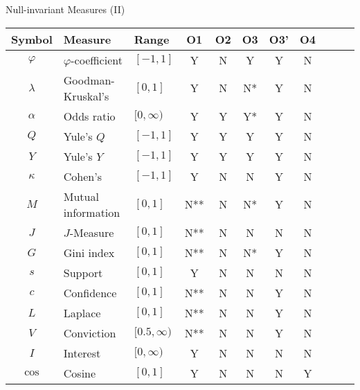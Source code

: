 \begin{frame}{Null-invariant Measures (II)}
	\centering
	\begin{tabular}{|c|l|l|c|c|c|c|c|c|c|c|}
		\hline
		\textbf{Symbol} & \textbf{Measure} & \textbf{Range} & 
		\textbf{O1} & \textbf{O2} & \textbf{O3} & \textbf{O3'} & 
		\textbf{O4} \\\hline
		$\varphi$ & $\varphi$-coefficient & $[-1,1]$       & Y   & N & Y  & Y 
		&   
		N \\
		$\lambda$ & Goodman-Kruskal's     & $[0,1]$        & Y   & N & N* & Y & 
		N \\
		$\alpha$  & Odds ratio            & $[0,\infty)$   & Y   & Y & Y* & Y & 
		N \\
		$Q$       & Yule's $Q$            & $[-1,1]$       & Y   & Y & Y  & Y & 
		N \\
		$Y$       & Yule's $Y$            & $[-1,1]$       & Y   & Y & Y  & Y & 
		N \\
		$\kappa$  & Cohen's               & $[-1,1]$       & Y   & N & N  & Y & 
		N \\
		$M$       & Mutual information    & $[0,1]$        & N** & N & N* & Y & 
		N \\
		$J$       & $J$-Measure           & $[0,1]$        & N** & N & N  & N & 
		N \\
		$G$       & Gini index            & $[0,1]$        & N** & N & N* & Y & 
		N \\
		$s$       & Support               & $[0,1]$        & Y   & N & N  & N & 
		N \\
		{\color{red}$c$} & {\color{red}Confidence} & 
		{\color{red}$[0,1]$} & {\color{red}N**} & {\color{red}N} & 
		{\color{red}N} & {\color{red}Y} & {\color{red}N} \\
		$L$       & Laplace               & $[0,1]$        & N** & N & N  & Y & 
		N \\
		$V$       & Conviction            & $[0.5,\infty)$ & N** & N & N  & Y & 
		N \\
		$I$       & Interest              & $[0,\infty)$   & Y   & N & N  & N & 
		N \\
		{\color{red}$\cos$} & {\color{red}Cosine} & 
		{\color{red}$[0,1]$} & {\color{red}Y} & {\color{red}N} & 
		{\color{red}N} & {\color{red}N} & {\color{red}Y} \\\hline
	\end{tabular}
\end{frame}

